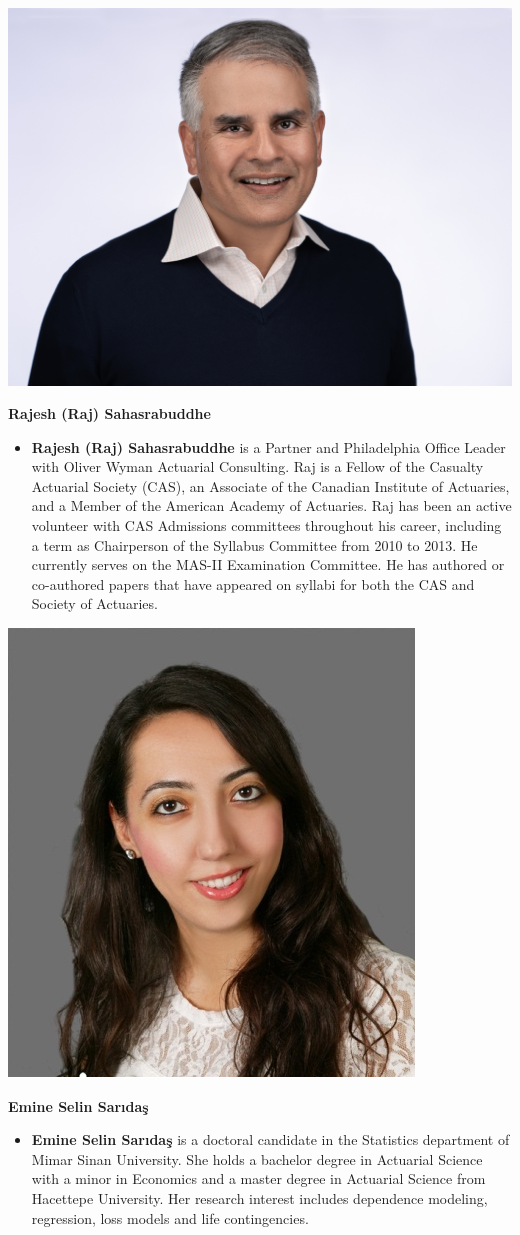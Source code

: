 \documentclass[
  12pt,
  krantz2]{Format/krantzNoCorner}
\providecommand{\tightlist}{%
  \setlength{\itemsep}{0pt}\setlength{\parskip}{0pt}}
\begin{document}
\begin{center}\includegraphics[width=0.3\linewidth,height=0.5\textheight]{ContributorPics/RajSahasrabuddhe} \end{center}

\begin{center}
\textbf{ Rajesh (Raj) Sahasrabuddhe }
\end{center}

\begin{itemize}
\tightlist
\item
  \textbf{Rajesh (Raj) Sahasrabuddhe} is a Partner and Philadelphia Office Leader with Oliver Wyman Actuarial Consulting. Raj is a Fellow of the Casualty Actuarial Society (CAS), an Associate of the Canadian Institute of Actuaries, and a Member of the American Academy of Actuaries. Raj has been an active volunteer with CAS Admissions committees throughout his career, including a term as Chairperson of the Syllabus Committee from 2010 to 2013. He currently serves on the MAS-II Examination Committee. He has authored or co-authored papers that have appeared on syllabi for both the CAS and Society of Actuaries.
\end{itemize}

\newpage

\begin{center}\includegraphics[width=0.2\linewidth,height=0.3\textheight]{ContributorPics/Selin_pictureA} \end{center}

\begin{center}
\textbf{ Emine Selin Sarıdaş }
\end{center}

\begin{itemize}
\tightlist
\item
  \textbf{Emine Selin Sarıdaş} is a doctoral candidate in the Statistics department of Mimar Sinan University. She holds a bachelor degree in Actuarial Science with a minor in Economics and a master degree in Actuarial Science from Hacettepe University. Her research interest includes dependence modeling, regression, loss models and life contingencies.
\end{itemize}
\end{document}
